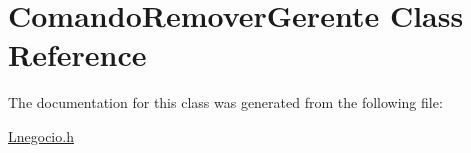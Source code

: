 \hypertarget{class_comando_remover_gerente}{}\section{Comando\+Remover\+Gerente Class Reference}
\label{class_comando_remover_gerente}


The documentation for this class was generated from the following file\+:\begin{DoxyCompactItemize}
\item 
\hyperlink{_lnegocio_8h}{Lnegocio.\+h}\end{DoxyCompactItemize}
